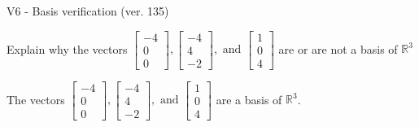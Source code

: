 \begin{exercise}
  \begin{exerciseTitle}V6 - Basis verification (ver. 135)\end{exerciseTitle}
  \begin{exerciseStatement}
    Explain why the vectors \(\left[\begin{array}{r}
-4 \\
0 \\
0
\end{array}\right] , \left[\begin{array}{r}
-4 \\
4 \\
-2
\end{array}\right] , \text{ and } \left[\begin{array}{r}
1 \\
0 \\
4
\end{array}\right]\) are or are not a basis of \(\mathbb{R}^3\)	


  \end{exerciseStatement}
  \begin{exerciseAnswer}
   The vectors \(\left[\begin{array}{r}
-4 \\
0 \\
0
\end{array}\right] , \left[\begin{array}{r}
-4 \\
4 \\
-2
\end{array}\right] , \text{ and } \left[\begin{array}{r}
1 \\
0 \\
4
\end{array}\right]\) 
  	 are  a basis of \(\mathbb{R}^3\).
  


  \end{exerciseAnswer}
\end{exercise}